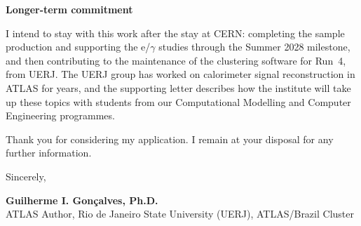 \documentclass[11pt,a4paper]{article}
\begin{document}
\textbf{\color{SlateGrey}Longer-term commitment}

I intend to stay with this work after the stay at CERN: completing the sample production and supporting the e/$\gamma$ studies through the Summer 2028 milestone, and then contributing to the maintenance of the clustering software for Run~4, from UERJ. The UERJ group has worked on calorimeter signal reconstruction in ATLAS for years, and the supporting letter describes how the institute will take up these topics with students from our Computational Modelling and Computer Engineering programmes.

Thank you for considering my application. I remain at your disposal for any further information.

\vspace{0.5em}

\closing{Sincerely,}

\vspace{1.5em}

\textbf{Guilherme I. Gonçalves, Ph.D.}\\
{\small ATLAS Author, Rio de Janeiro State University (UERJ), ATLAS/Brazil Cluster}
\end{document}

